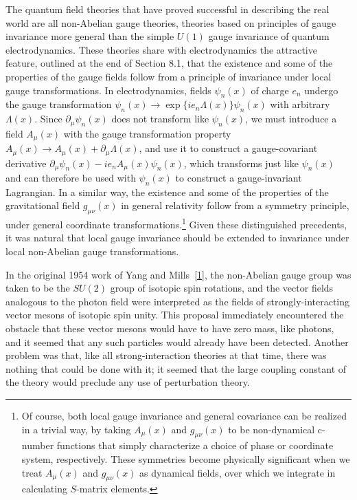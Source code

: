 
The quantum field theories that have proved successful in describing the
real world are all non-Abelian gauge theories, theories based on principles
of gauge invariance more general than the simple $U(1)$ gauge invariance
of quantum electrodynamics. These theories share with electrodynamics
the attractive feature, outlined at the end of Section 8.1, that the existence
and some of the properties of the gauge fields follow from a principle
of invariance under local gauge transformations. In electrodynamics,
fields $\psi_n(x)$ of charge $e_n$ undergo the gauge transformation
$\psi_n(x)\longrightarrow\exp\{ie_n\Lambda(x)\}\psi_n(x)$ with arbitrary
$\Lambda(x)$. Since $\partial_\mu\psi_n(x)$ does not transform like $\psi_n(x)$,
we must introduce a field $A_\mu(x)$ with the gauge transformation property
$A_\mu(x)\longrightarrow A_\mu(x)+\partial_\mu\Lambda(x)$, and use it to construct
a gauge-covariant derivative
$\partial_\mu\psi_n(x)-ie_nA_\mu(x)\psi_n(x)$, which transforms just like
$\psi_n(x)$ and can therefore be used with $\psi_n(x)$ to construct a
gauge-invariant Lagrangian. In a similar way, the existence and some of the
properties of the gravitational field $g_{\mu\nu}(x)$ in general relativity
follow from a symmetry principle, under general coordinate transformations.\footnote{Of course,
both local gauge invariance and general covariance can be realized in a trivial
way, by taking $A_\mu(x)$ and $g_{\mu\nu}(x)$ to be non-dynamical c-number
functions that simply characterize a choice of phase or coordinate system,
respectively. These symmetries become physically significant when we treat
$A_\mu(x)$ and $g_{\mu\nu}(x)$ as dynamical fields, over which we integrate in
calculating $S$-matrix elements.} Given these distinguished precedents, it was
natural that local gauge invariance should be extended to invariance under local
non-Abelian gauge transformations.

In the original 1954 work of Yang and Mills~\hyperref[ch15-ref-1]{[1]}, the
non-Abelian gauge group was taken to be the $SU(2)$ group of isotopic spin
rotations, and the vector fields analogous to the photon field were interpreted
as the fields of strongly-interacting vector mesons of isotopic spin unity. This
proposal immediately encountered the obstacle that these vector mesons would
have to have zero mass, like photons, and it seemed that any such particles would
already have been detected. Another problem was that, like all strong-interaction
theories at that time, there was nothing that could be done with it; it seemed that
the large coupling constant of the theory would preclude any use of perturbation
theory.


